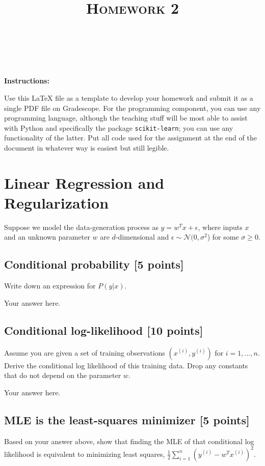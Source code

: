 \documentclass[a4paper]{article}
\title{\textsc{Homework 2}} %
\author{
\red{$>>$NAME HERE$<<$} \\
\red{$>>$ID HERE$<<$}\\
}
\date{}
\theoremstyle{definition}
\begin{document}
\maketitle 


\textbf{Instructions:} 

Use this LaTeX file as a template to develop your homework and submit it as a single PDF file on Gradescope. 
For the programming component, you can use any programming language, although the teaching stuff will be most able to assist with Python and specifically the package {\tt scikit-learn}; 
you can use any functionality of the latter.
Put all code used for the assignment at the end of the document in whatever way is easiest but still legible.

\section{Linear Regression and Regularization}
Suppose we model the data-generation process as $y=w^Tx+\epsilon$, where inputs $x$ and an unknown parameter $w$ are $d$-dimensional and $\epsilon\sim\mathcal N(0,\sigma^2$) for some $\sigma\ge0$.

\subsection{Conditional probability [5 points]}
	Write down an expression for $P(y \vert x)$.
	
	{\color{blue}
	Your answer here.
	}
	
\subsection{Conditional log-likelihood [10 points]}
	Assume you are given a set of training observations $(x^{(i)}, y^{(i)})$ for $i = 1,\ldots,n$.   
	Derive the conditional log likelihood of this training data.   
	Drop any constants that do not depend on the parameter $w$.
	
	{\color{blue}
		Your answer here.
	}
	
\subsection{MLE is the least-squares minimizer [5 points]}
	Based on your answer above, show that finding the MLE of that conditional log likelihood is equivalent to minimizing least squares, $\frac{1}{2}\sum\limits_{i=1}^n (y^{(i)} - w^Tx^{(i)})^2 $.
	
\end{document}
